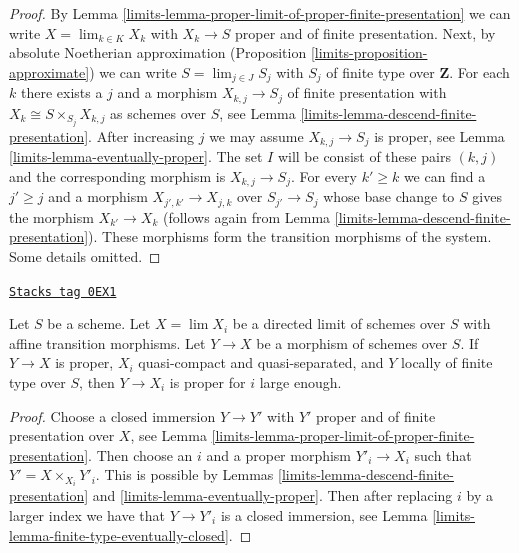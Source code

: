 \begin{proof}

By Lemma \ref{limits-lemma-proper-limit-of-proper-finite-presentation}
we can write $X = \lim_{k \in K} X_k$ with $X_k \to S$ proper and
of finite presentation. Next, by absolute Noetherian approximation
(Proposition \ref{limits-proposition-approximate}) we can
write $S = \lim_{j \in J} S_j$ with $S_j$ of finite type over $\mathbf{Z}$.
For each $k$ there exists a $j$ and a morphism $X_{k, j} \to S_j$
of finite presentation with $X_k \cong S \times_{S_j} X_{k, j}$
as schemes over $S$, see
Lemma \ref{limits-lemma-descend-finite-presentation}.
After increasing $j$ we may assume $X_{k, j} \to S_j$ is proper, see
Lemma \ref{limits-lemma-eventually-proper}. The set $I$ will be consist
of these pairs $(k, j)$ and the corresponding morphism is $X_{k, j} \to S_j$.
For every $k' \geq k$ we can find a $j' \geq j$ and a morphism
$X_{j', k'} \to X_{j, k}$ over $S_{j'} \to S_j$ whose base change to $S$
gives the morphism $X_{k'} \to X_k$ (follows again from
Lemma \ref{limits-lemma-descend-finite-presentation}).
These morphisms form the transition morphisms of the system. Some details
omitted.
\end{proof}

\begin{lemma}
\label{limits-lemma-finite-type-eventually-proper}
\href{https://stacks.math.columbia.edu/tag/0EX1}{\texttt{Stacks tag 0EX1}}

Let $S$ be a scheme. Let $X = \lim X_i$ be a directed limit of
schemes over $S$ with affine transition morphisms. Let $Y \to X$
be a morphism of schemes over $S$.
If $Y \to X$ is proper, $X_i$ quasi-compact and quasi-separated, and
$Y$ locally of finite type over $S$, then $Y \to X_i$ is proper
for $i$ large enough.
\end{lemma}

\begin{proof}

Choose a closed immersion $Y \to Y'$ with $Y'$ proper and of finite
presentation over $X$, see
Lemma \ref{limits-lemma-proper-limit-of-proper-finite-presentation}.
Then choose an $i$ and a proper morphism $Y'_i \to X_i$
such that $Y' = X \times_{X_i} Y'_i$. This is possible by
Lemmas \ref{limits-lemma-descend-finite-presentation} and
\ref{limits-lemma-eventually-proper}. Then after replacing $i$
by a larger index we have that $Y \to Y'_i$ is a closed
immersion, see Lemma \ref{limits-lemma-finite-type-eventually-closed}.
\end{proof}

